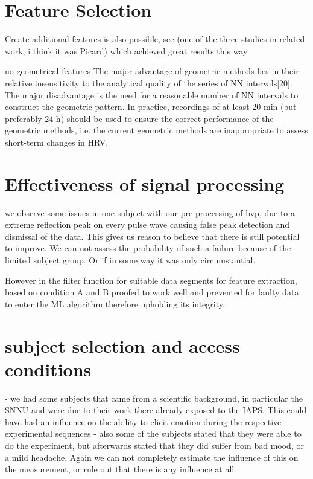 \section{Feature Selection}
Create additional features is also possible, see (one of the three studies in related work, i think it was Picard) which achieved great results this way

no geometrical features 
The major advantage of geometric methods lies
in their relative insensitivity to the analytical quality of
the series of NN intervals[20]. The major disadvantage is
the need for a reasonable number of NN intervals to
construct the geometric pattern. In practice, recordings
of at least 20 min (but preferably 24 h) should be used
to ensure the correct performance of the geometric
methods, i.e. the current geometric methods are inappropriate
to assess short-term changes in HRV.

\section{Effectiveness of signal processing}
we observe some issues in one subject with our pre processing of bvp, due to a extreme reflection peak on every pulse wave causing false peak detection and dismissal of the data. This gives us reason to believe that there is still potential to improve. We can not assess the probability of such a failure because of the limited subject group. Or if in some way it was only circumstantial.

However in the filter function for suitable data segments for feature extraction, based on condition A and B proofed to work well and prevented for faulty data to enter the ML algorithm therefore upholding its integrity.

\section{subject selection and access conditions}
- we had some subjects that came from a scientific background, in particular the SNNU and were due to their work there already exposed to the IAPS. This could have had an influence on the ability to elicit emotion during the respective experimental sequences 
- also some of the subjects stated that they were able to do the experiment, but afterwards stated that they did suffer from bad mood, or a mild headache. Again we can not completely estimate the influence of this on the measurement, or rule out that there is any influence at all

